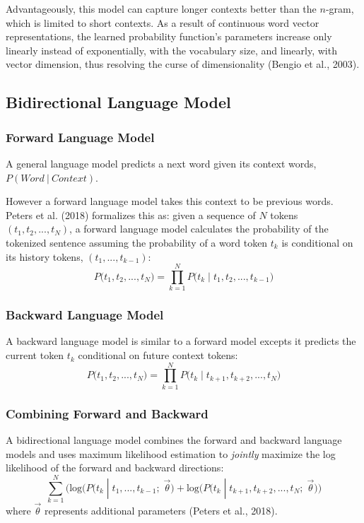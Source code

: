 Advantageously, this model can capture longer contexts better than the $n$-gram, which is limited to short contexts. As a result of continuous word vector representations, the learned probability function's parameters increase only linearly instead of exponentially, with the vocabulary size, and linearly, with vector dimension, thus resolving the curse of dimensionality (Bengio et al., 2003). 



\subsection{Bidirectional Language Model}

\subsubsection{Forward Language Model}

A general language model predicts a next word given its context words, $P(\textit{Word} \: | \: \textit{Context})$. 

However a forward language model takes this context to be previous words. Peters et al. (2018) formalizes this as:  given a sequence of $N$ tokens $(t_1, t_2, ..., t_N)$, a forward language model calculates the probability of the tokenized sentence assuming the probability of a word token $t_k$ is conditional on its history tokens, $(t_1, ..., t_{k-1})$:
$$
P \Big(t_1, t_2, ..., t_N \Big) = \prod_{k=1}^N P \Big(t_k \; | \; t_1, t_2, ..., t_{k-1} \Big)
$$

\subsubsection{Backward Language Model}

A backward language model is similar to a forward model excepts it predicts the current token $t_k$ conditional on future context tokens:
$$
P \Big(t_1, t_2, ..., t_N \Big) = \prod_{k=1}^N P \Big(t_k \; | \; t_{k+1}, t_{k+2}, ..., t_N \Big)
$$

\subsubsection{Combining Forward and Backward}

A bidirectional language model combines the forward and backward language models and uses maximum likelihood estimation to \emph{jointly} maximize the log likelihood of the forward and backward directions: 
$$
\sum_{k=1}^N \Big( \text{log} \Big( P \Big(t_k \; | \; t_1,...,t_{k-1}; \; \overrightarrow{\theta} \Big) + \text{log} \Big( P \Big(t_k \; | \; t_{k+1}, t_{k+2}, ..., t_N; \; \overrightarrow{\theta} \Big) \Big)
$$
where $\overrightarrow{\theta}$ represents additional parameters (Peters et al., 2018). 


